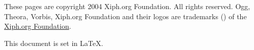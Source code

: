 \documentclass[9pt,letterpaper]{book}
\numberwithin{equation}{chapter}
\numberwithin{figure}{chapter}
\numberwithin{table}{chapter}
\begin{document}
These pages are copyright \textcopyright{} 2004 Xiph.org Foundation.
All rights reserved.
Ogg, Theora, Vorbis, Xiph.org Foundation and their logos are trademarks
 (\texttrademark) of the \href{http://www.xiph.org}{Xiph.org Foundation}.

This document is set in \LaTeX.



\cleardoublepage

\end{document}
